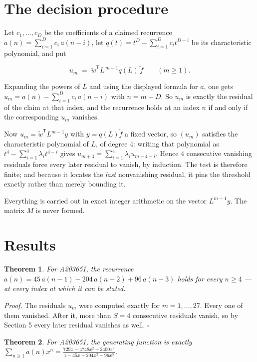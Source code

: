 \documentclass[11pt]{article}
\newtheorem{theorem}{Theorem}
\theoremstyle{definition}
\begin{document}
\section{The decision procedure}

Let $c_1,\dots,c_D$ be the coefficients of a claimed recurrence $a(n) = \sum_{i=1}^{D} c_i\,a(n-i)$, let $q(t) = t^{D} - \sum_{i=1}^{D} c_i t^{D-i}$ be its characteristic polynomial, and put

\[u_m \;=\; \tilde w^{\mathsf T} L^{\,m-1} q(L)\,\tilde f \qquad (m \ge 1).\]

Expanding the powers of $L$ and using the displayed formula for $a$, one gets $u_m = a(n) - \sum_{i=1}^{D} c_i\,a(n-i)$ with $n = m + D$. So $u_m$ is exactly the residual of the claim at that index, and the recurrence holds at an index $n$ if and only if the corresponding $u_m$ vanishes.

Now $u_m = \tilde w^{\mathsf T} L^{m-1} y$ with $y = q(L)\tilde f$ a fixed vector, so $(u_m)$ satisfies the characteristic polynomial of $L$, of degree $4$: writing that polynomial as $t^{4} - \sum_{i=1}^{4} \lambda_i t^{4-i}$ gives $u_{m+4} = \sum_{i=1}^{4} \lambda_i u_{m+4-i}$. Hence $4$ consecutive vanishing residuals force every later residual to vanish, by induction. The test is therefore finite; and because it locates the {\itshape last} nonvanishing residual, it pins the threshold exactly rather than merely bounding it.

Everything is carried out in exact integer arithmetic on the vector $L^{m-1}y$. The matrix $M$ is never formed.

\section{Results}

\begin{theorem} For A203651, the recurrence $a(n) = 45\,a(n-1) - 204\,a(n-2) + 96\,a(n-3)$ holds for every $n \ge 4$ --- at every index at which it can be stated.\end{theorem}

{\itshape Proof.} The residuals $u_m$ were computed exactly for $m = 1,\dots,27$. Every one of them vanished. After it, more than $S = 4$ consecutive residuals vanish, so by Section 5 every later residual vanishes as well. $\square$

\begin{theorem} For A203651, the generating function is exactly $\sum_{n\ge 1} a(n)x^n = \frac{729x - 4748x^{2} + 2400x^{3}}{1 - 45x + 204x^{2} - 96x^{3}}$.\end{theorem}
\end{document}
